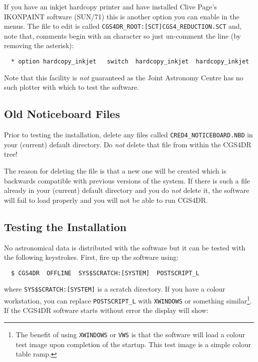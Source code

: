 If you have an inkjet hardcopy printer and have installed Clive Page's
IKONPAINT software (SUN/71) this is another option you can enable in the
menus. The file to edit is called {\tt CGS4DR\_ROOT:[SCT]CGS4\_REDUCTION.SCT}
and, note that, comments begin with an {\tt *} character so just un-comment 
the line (by removing the asterisk):

\begin{verbatim}
  * option hardcopy_inkjet   switch  hardcopy_inkjet  hardcopy_inkjet
\end{verbatim}

Note that this facility is {\em not} guaranteed as the Joint Astronomy Centre 
has no such plotter with which to test the software.

\subsection{Old Noticeboard Files}

Prior to testing the installation, delete any files called
{\tt CRED4\_NOTICEBOARD.NBD} in your (current) default directory.
Do {\em not} delete that file from within the CGS4DR tree!

The reason for deleting the file is that a new one will be created which
is backwards compatible with previous versions of the system. If there is 
such a file already in your (current) default directory and you do {\em not} 
delete it, the software will fail
to load properly and you will not be able to run CGS4DR.

\subsection{Testing the Installation}

No astronomical data is distributed with the software but it can be tested 
with the following keystrokes. First, fire up the software using:

\begin{verbatim}
  $ CGS4DR  OFFLINE  SYS$SCRATCH:[SYSTEM]  POSTSCRIPT_L
\end{verbatim}

where {\tt SYS\$SCRATCH:[SYSTEM]} is a scratch directory. If you have a colour 
workstation, you can replace {\tt POSTSCRIPT\_L} with {\tt XWINDOWS} or 
something similar\footnote{The benefit of using {\tt XWINDOWS} or {\tt VWS} 
is that the software will load a colour test image upon completion of the 
startup. This test image is a simple colour table ramp.}.
If the CGS4DR software starts without error the display will show:

